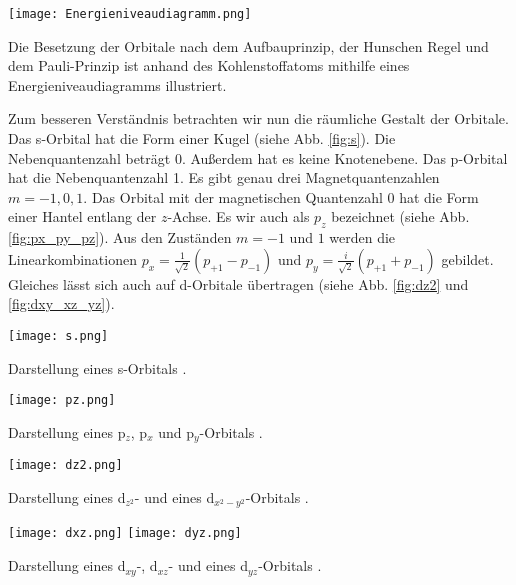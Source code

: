 \begin{dsafigure}
 \centering
 \texttt{[image: Energieniveaudiagramm.png]}
 \caption{Die Besetzung der Orbitale nach dem Aufbauprinzip, der Hunschen Regel und dem Pauli-Prinzip ist anhand des Kohlenstoffatoms mithilfe eines Energieniveaudiagramms illustriert.}
 \label{fig:Energieniveaudiagramm}
\end{dsafigure}

Zum besseren Verständnis betrachten wir nun die räumliche Gestalt der Orbitale.
Das s-Orbital hat die Form einer Kugel (siehe Abb. \ref{fig:s}).
Die Nebenquantenzahl beträgt $0$. Außerdem hat es keine Knotenebene. Das
p-Orbital hat die Nebenquantenzahl 1. Es gibt genau drei Magnetquantenzahlen
$m = -1, 0, 1$. Das Orbital mit der magnetischen Quantenzahl $0$ hat die Form
einer Hantel entlang der $z$-Achse. Es wir auch als $p_{z}$ bezeichnet
(siehe Abb. \ref{fig:px_py_pz}). Aus den Zuständen $m = -1$ und $1$ werden
die Linearkombinationen $p_{x} = \frac{1}{\sqrt{2}} (p_{+1} - p_{-1})$
und $p_{y} = \frac{i}{\sqrt{2}}(p_{+1}+p_{-1})$
gebildet. Gleiches lässt sich auch auf
d-Orbitale übertragen (siehe Abb. \ref{fig:dz2} und \ref{fig:dxy_xz_yz}).

\begin{dsafigure}
 \centering
 \texttt{[image: s.png]}
 \caption{Darstellung eines s-Orbitals \cite{ADF2017authors}.}
 \label{fig:s}
\end{dsafigure}

\begin{dsafigure}
 \centering
 \texttt{[image: pz.png]}
 \caption{Darstellung eines p$_{z}$, p$_{x}$ und p$_{y}$-Orbitals \cite{ADF2017authors}.}
 \label{fig:px_py_pz}
\end{dsafigure}

\begin{dsafigure}
 \centering
 \hfill
 \texttt{[image: dz2.png]}
 \hfill
 \hfill
 \caption{Darstellung eines d$_{z^{2}}$- und eines d$_{x^{2}-y^{2}}$-Orbitals
          \cite{ADF2017authors}.}
 \label{fig:dz2}
\end{dsafigure}

\begin{dsafigure}
 \centering
 \hfill
 \hfill
 \texttt{[image: dxz.png]}
 \hfill
 \texttt{[image: dyz.png]}
 \hfill
 \caption{Darstellung eines d$_{xy}$-, d$_{xz}$- und eines
          d$_{yz}$-Orbitals \cite{ADF2017authors}.}
 \label{fig:dxy_xz_yz}
\end{dsafigure}

